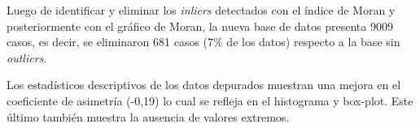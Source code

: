 \documentclass[11pt,b5paper,]{krantz}
\newenvironment{Shaded}{}{}
\newcommand{\CommentTok}[1]{\textcolor[rgb]{0.38,0.63,0.69}{\textit{#1}}}
\newcommand{\DecValTok}[1]{\textcolor[rgb]{0.25,0.63,0.44}{#1}}
\newcommand{\FloatTok}[1]{\textcolor[rgb]{0.25,0.63,0.44}{#1}}
\newcommand{\KeywordTok}[1]{\textcolor[rgb]{0.00,0.44,0.13}{\textbf{#1}}}
\newcommand{\NormalTok}[1]{#1}
\newcommand{\OperatorTok}[1]{\textcolor[rgb]{0.40,0.40,0.40}{#1}}
\newcommand{\OtherTok}[1]{\textcolor[rgb]{0.00,0.44,0.13}{#1}}
\newcommand{\StringTok}[1]{\textcolor[rgb]{0.25,0.44,0.63}{#1}}
\begin{document}
\begin{Shaded}
\end{Shaded}

Luego de identificar y eliminar los \emph{inliers} detectados con el índice de Moran y posteriormente con el gráfico de Moran, la nueva base de datos presenta 9009 casos, es decir, se eliminaron 681 casos (7\% de los datos) respecto a la base sin \emph{outliers}.

Los estadísticos descriptivos de los datos depurados muestran una mejora en el coeficiente de asimetría (-0,19) lo cual se refleja en el histograma y box-plot. Este último también muestra la ausencia de valores extremos.

\begin{Shaded}
\end{Shaded}
\end{document}
